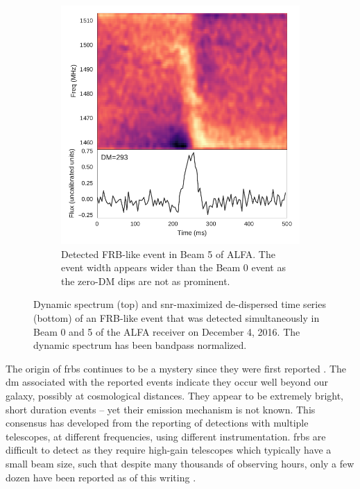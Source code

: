\documentclass[a4paper,fleqn,usenatbib]{mnras}
\begin{document}
\begin{figure}
\begin{subfigure}[t]{0.45\textwidth}
        \includegraphics[width=1.0\textwidth]{figures/D20161204_buf4_Beam5.pdf}
        \caption{Detected FRB-like event in Beam 5 of ALFA. The event width
        appears wider than the Beam 0 event as the zero-DM dips are not as
        prominent.
        }
        \label{fig:beam5_dynamic_spec}
    \end{subfigure}
    \caption{
    Dynamic spectrum (top) and \gls{snr}-maximized de-dispersed time series
    (bottom) of an FRB-like event that was detected simultaneously in Beam 0 and
    5 of the ALFA receiver on December 4, 2016. The dynamic spectrum has been
    bandpass normalized.
    }
    \label{fig:dynamic_spec}
\end{figure}

The origin of \glspl{frb} continues to be a mystery since they were first
reported \citep{2007Sci...318..777L}. The \gls{dm} associated with the reported
events indicate they occur well beyond our galaxy, possibly at cosmological
distances. They appear to be extremely bright, short duration events -- yet
their emission mechanism is not known.  This consensus has developed from the
reporting of detections with multiple telescopes, at different frequencies,
using different instrumentation. \glspl{frb} are difficult to detect as they
require high-gain telescopes which typically have a small beam size, such that
despite many thousands of observing hours, only a few dozen have been reported
as of this writing \citep{2016PASA...33...45P}.
\end{document}
